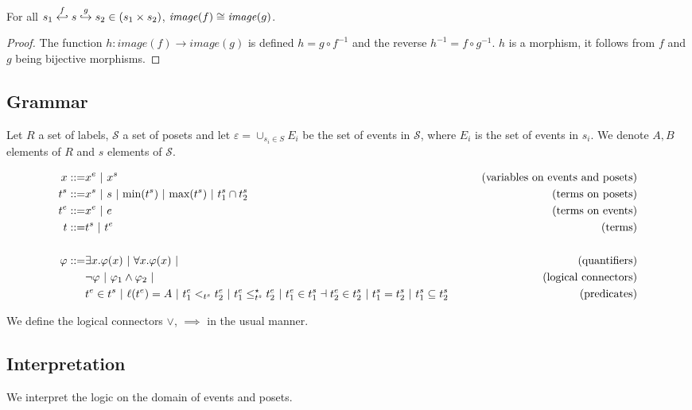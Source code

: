 \begin{property}
  For all $s_1\overset{f}{\hookleftarrow} s\overset{g}{\hookrightarrow} s_2 \in (s_1\times s_2)$, $\mathit{image}(f) \cong \mathit{image}(g)$.
\end{property}
\begin{proof}
  The function $h:\mathit{image}(f)\to\mathit{image}(g)$ is defined $h = g \circ f^{-1}$ and the reverse $h^{-1} = f \circ g^{-1}$. $h$ is a morphism, it follows from $f$ and $g$ being bijective morphisms.
\end{proof}

\subsection{Grammar}

Let $R$ a set of labels, $\mathcal{S}$ a set of posets and let $\varepsilon = \cup_{s_i\in S} E_i$ be the set of events in $\mathcal{S}$, where $E_i$ is the set of events in $s_i$.
We denote $A,B$ elements of $R$ and $s$ elements of $\mathcal{S}$.

\begin{align*}
  x ::= & x^e ~|~ x^s & \tag{variables on events and posets} \\
  t^s ::= & x^s ~|~ s ~|~ \text{min}(t^s) ~|~ \text{max}(t^s) ~|~ t^s_1 \cap t^s_2 &\tag{terms on posets} \\
  t^e ::= & x^e ~|~ e & \tag{terms on events}\\
  t ::= & t^s ~|~ t^e & \tag{terms}\\
  \\
  \varphi ::= & \exists x.\varphi(x) ~|~ \forall x.\varphi(x) ~|&\tag{quantifiers}\\
  & \neg \varphi ~|~\varphi_1 \wedge \varphi_2~|&\tag{logical connectors}\\
  & t^e\in t^s ~|~ \ell(t^e) = A ~|~ t^e_1 <_{t^s} t^e_2 ~|~ t^e_1 \leq^{\star}_{t^s} t^e_2 ~|~ t^e_1\in t^s_1 \dashv t^e_2\in t^s_2~|~ t^s_1 = t^s_2 ~|~ t^s_1\subseteq t^s_2
  & \tag{predicates}\\
\end{align*}

We define the logical connectors $\vee$, $\implies$ in the usual manner.

\subsection{Interpretation}

We interpret the logic on the domain of events and posets.

